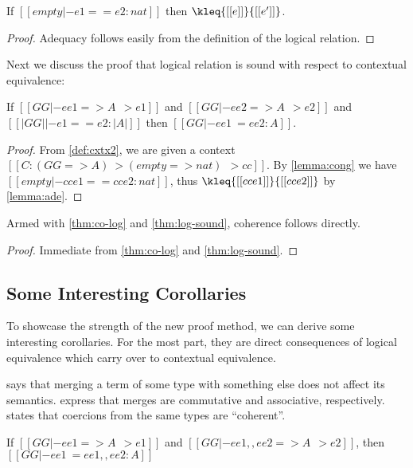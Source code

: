\begin{lemma}[Adequacy] \label{lemma:ade}
  If $[[  empty |- e1 == e2 : nat ]]$ then $\kleq{[[e]]}{[[e']]}$.
\end{lemma}
\begin{proof}
  Adequacy follows easily from the definition of the logical relation.
\end{proof}


Next we discuss the proof that logical relation is sound with respect to contextual equivalence:
\begin{theorem} \label{thm:log-sound}
  If $[[ GG |- ee1 => A ~~> e1]]$ and $[[ GG |- ee2 => A ~~> e2]]$ and $  [[|GG| |- e1 == e2 : |A|]]  $ then
  $[[   GG |- ee1 ~= ee2 : A ]]$.
\end{theorem}
\begin{proof}
  From \cref{def:cxtx2}, we are given a context $[[  C : (GG => A) ~> (empty => nat) ~~> cc ]]$. By \cref{lemma:cong}
  we have $[[  empty |- cc{e1} == cc{e2} : nat  ]]$, thus $  \kleq{[[ cc{e1} ]]}{ [[cc{e2} ]]}    $ by \cref{lemma:ade}.
\end{proof}


Armed with \cref{thm:co-log} and \cref{thm:log-sound}, coherence follows directly.
\coherence*
\begin{proof}
  Immediate from \cref{thm:co-log} and \cref{thm:log-sound}.
\end{proof}

\subsection{Some Interesting Corollaries}

To showcase the strength of the new proof method, we can derive some
interesting corollaries. For the most part, they are direct consequences of
logical equivalence which carry over to contextual equivalence.


 says that merging a term of some type with something else
does not affect its semantics.  express that
merges are commutative and associative, respectively. 
states that coercions from the same types are ``coherent''.

\begin{corollary} \label{lemma:neutral}
  If $[[GG |- ee1 => A ~~> e1 ]]$ and $[[GG |- ee1 ,, ee2 => A ~~> e2]]$, then
  $[[GG |- ee1 ~= ee1 ,, ee2 : A]]$
\end{corollary}

